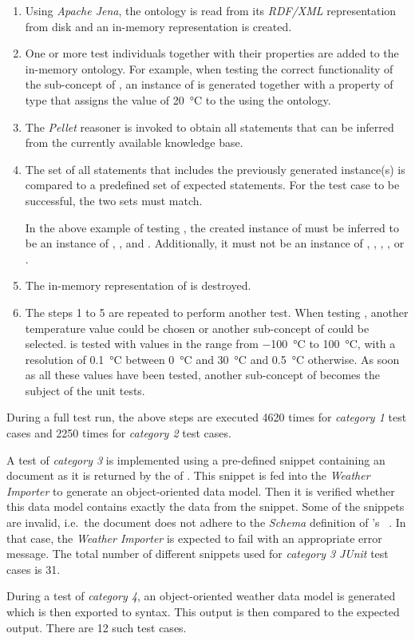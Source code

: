 \begin{enumerate}
  \item Using \emph{Apache Jena}, the \smarthomeweather ontology is read from its \emph{RDF/XML} representation from disk and an in-memory representation is created.
  \item One or more test individuals together with their properties are added to the in-memory ontology. For example, when testing the correct functionality of the sub-concept  of , an instance of  is generated together with a property of type  that assigns the value of \SI{20}{\celsius} to the  using the \muo ontology.
  \item The \emph{Pellet} reasoner is invoked to obtain all statements that can be inferred from the currently available knowledge base.
  \item The set of all statements that includes the previously generated instance(s) is compared to a predefined set of expected statements. For the test case to be successful, the two sets must match.
  
  In the above example of testing , the created instance of  must be inferred to be an instance of , , and . Additionally, it must not be an instance of , , , , or .
  \item The in-memory representation of \smarthomeweather is destroyed.
  \item The steps 1 to 5 are repeated to perform another test. When testing , another temperature value could be chosen  or another sub-concept of  could be selected.  is tested with values in the range from \SI{-100}{\celsius} to \SI{100}{\celsius}, with a resolution of \SI{0.1}{\celsius} between \SI{0}{\celsius} and \SI{30}{\celsius} and \SI{0.5}{\celsius} otherwise. As soon as all these values have been tested, another sub-concept of  becomes the subject of the unit tests.
\end{enumerate}

During a full test run, the above steps are executed \num{4620} times for \emph{category 1} test cases and \num{2250} times for \emph{category 2} test cases.

A test of \emph{category 3} is implemented using a pre-defined snippet containing an  document as it is returned by the  of \yrno. This snippet is fed into the \emph{Weather Importer} to generate an object-oriented data model. Then it is verified whether this data model contains exactly the data from the snippet. Some of the snippets are invalid, i.e.\ the  document does not adhere to the  \emph{Schema} definition of \yrno's ~\cite{yrno_schema}.
In that case, the \emph{Weather Importer} is expected to fail with an appropriate error message. The total number of different snippets used for \emph{category 3} \emph{JUnit} test cases is \num{31}.

During a test of \emph{category 4}, an object-oriented weather data model is generated which is then exported to  syntax. This output is then compared to the expected output. There are \num{12} such test cases.
